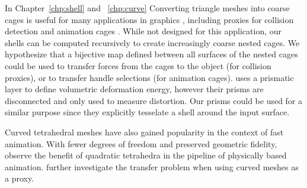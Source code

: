 In Chapter~\ref{chp:shell} and ~\ref{chp:curve}
Converting triangle meshes into coarse cages is useful for many applications in graphics \cite{sacht2015nested}, including proxies for collision detection \cite{Calderon:2017} and animation cages \cite{Thiery:2012}. While not designed for this application, our shells can be computed recursively to create increasingly coarse nested cages. We hypothesize that a bijective map defined between all surfaces of the nested cages could be used to transfer forces from the cages to the object (for collision proxies), or to transfer handle selections (for animation cages). \cite{botsch2006primo,botsch2003multiresolution} uses a prismatic layer to define volumetric deformation energy, however their prisms are disconnected and only used to measure distortion. Our prisms could be used for a similar purpose since they explicitly tesselate a shell around the input surface.

Curved tetrahedral meshes have also gained popularity in the context of fast animation. With fewer degrees of freedom and preserved geometric fidelity, 
\cite{mezger2007finite} observe the benefit of quadratic tetrahedra in the pipeline of physically based animation.
\cite{Suwelack2013} further investigate the transfer problem when using curved meshes as a proxy.


